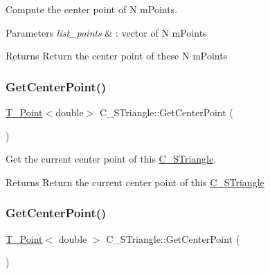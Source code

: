 Compute the center point of N m\+Points. 


\begin{DoxyParams}{Parameters}
{\em list\+\_\+points} & \+: vector of N m\+Points \\
\hline
\end{DoxyParams}
\begin{DoxyReturn}{Returns}
Return the center point of these N m\+Points 
\end{DoxyReturn}
\mbox{\label{classC__STriangle_a74bf0469da4e3a20ad272ce9b39f3537}} 
\subsubsection{\texorpdfstring{Get\+Center\+Point()}{GetCenterPoint()}\hspace{0.1cm}{\footnotesize\ttfamily [1/2]}}
{\footnotesize\ttfamily \hyperlink{classT__Point}{T\+\_\+\+Point}$<$double$>$ C\+\_\+\+S\+Triangle\+::\+Get\+Center\+Point (\begin{DoxyParamCaption}{ }\end{DoxyParamCaption})}



Get the current center point of this \hyperlink{classC__STriangle}{C\+\_\+\+S\+Triangle}. 

\begin{DoxyReturn}{Returns}
Return the current center point of this \hyperlink{classC__STriangle}{C\+\_\+\+S\+Triangle} 
\end{DoxyReturn}
\mbox{\label{classC__STriangle_ac9b374f16313b3c99eca7fe615d14851}} 
\subsubsection{\texorpdfstring{Get\+Center\+Point()}{GetCenterPoint()}\hspace{0.1cm}{\footnotesize\ttfamily [2/2]}}
{\footnotesize\ttfamily \hyperlink{classT__Point}{T\+\_\+\+Point}$<$ double $>$ C\+\_\+\+S\+Triangle\+::\+Get\+Center\+Point (\begin{DoxyParamCaption}{ }\end{DoxyParamCaption})}



